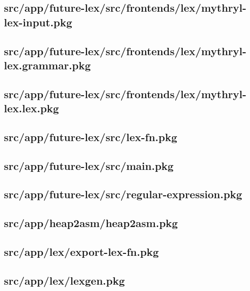 \subsection{src/app/future-lex/src/frontends/lex/mythryl-lex-input.pkg}


\subsection{src/app/future-lex/src/frontends/lex/mythryl-lex.grammar.pkg}


\subsection{src/app/future-lex/src/frontends/lex/mythryl-lex.lex.pkg}


\subsection{src/app/future-lex/src/lex-fn.pkg}


\subsection{src/app/future-lex/src/main.pkg}


\subsection{src/app/future-lex/src/regular-expression.pkg}


\subsection{src/app/heap2asm/heap2asm.pkg}


\subsection{src/app/lex/export-lex-fn.pkg}


\subsection{src/app/lex/lexgen.pkg}


